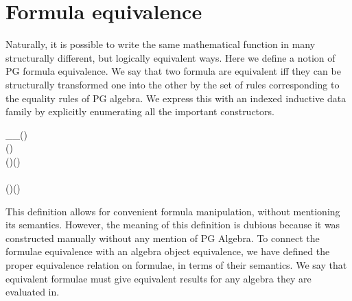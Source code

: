\section{Formula equivalence}

Naturally, it is possible to write the same mathematical function in many structurally different, but logically equivalent ways.
Here we define a notion of PG formula equivalence. We say that two formula are equivalent iff they 
can be structurally transformed one into the other by the set of rules corresponding to the equality rules of PG algebra.
We express this with an indexed inductive data family by explicitly enumerating all the important constructors.


\begin{hscode}\SaveRestoreHook
{}%
%
%
%
\>[B]{}\;\_\_\;\mathbin{:}\;\;(\;)\;\;{}\<[E]%
\\
\>[B]{}\<[10]%
\>[10]{}\;\;(\;)\;\;\;\;\<[E]%
\\
\>[B]{}\<[3]%
\>[3]{}\;\mathbin{:}\;\;\;\;\;\;(\;\C{+}\;)\;\C{+}\;\;\;\;\C{+}\;(\;\C{+}\;){}\<[E]%
\\
\>[B]{}\<[3]%
\>[3]{}\;\mathbin{:}\;\;\;\;\;\;\C{+}\;\;\;\;\C{+}\;\<[E]%
\\
\>[B]{}\<[3]%
\>[3]{}\;\mathbin{:}\;\;\;\;\;\;(\;\C{\seq}\;)\;\C{\seq}\;\;\;\;\C{\seq}\;(\;\C{\seq}\;){}\<[E]%
\\
\>[B]{}\<[3]%
\>[3]{}\<[E]%
\ColumnHook
\end{hscode}\resethooks

This definition allows for convenient formula manipulation, without mentioning its semantics.
However, the meaning of this definition is dubious because it was constructed manually without any mention of PG Algebra.
To connect the formulae equivalence with an algebra object equivalence, we have defined the proper equivalence relation on formulae, 
in terms of their semantics. We say that equivalent formulae must give equivalent results for any algebra they are evaluated in.

